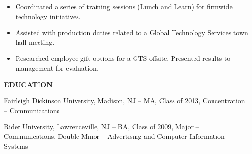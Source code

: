 \documentclass[letterpaper,12pt]{article}
\begin{document}
%
\begin{itemize}[nosep]
 \item
  Coordinated a series of training sessions (Lunch and Learn) for firmwide technology initiatives.
\item
  Assisted with production duties related to a Global Technology Services town hall meeting.
\item
  Researched employee gift options for a GTS offsite. Presented results to management for evaluation.
\end{itemize}
\begin{center}
\textbf{EDUCATION}
\end{center}
\begin{raggedright}
Fairleigh Dickinson University, Madison, NJ – MA, Class of 2013, Concentration – Communications\\
\end{raggedright}
\vspace*{0.35cm}
\begin{raggedright}
Rider University, Lawrenceville, NJ – BA, Class of 2009, Major – Communications, Double Minor – Advertising and Computer Information Systems
\end{raggedright}
\end{document}
